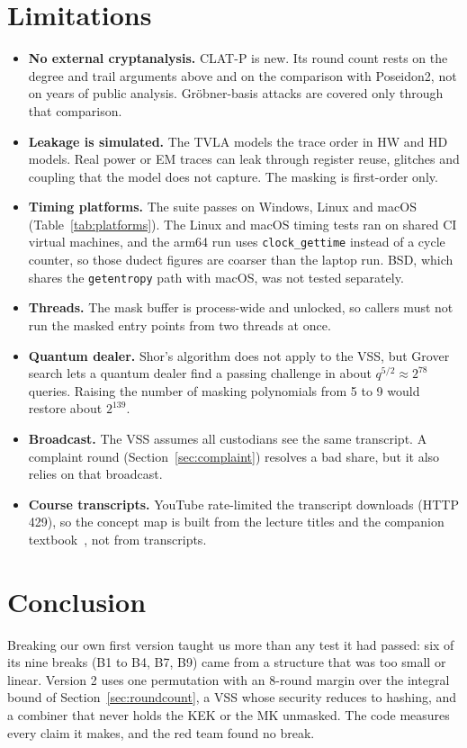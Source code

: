 \documentclass[10pt,a4paper]{article}
\newcommand{\code}[1]{\texttt{#1}}
\theoremstyle{definition}
\theoremstyle{remark}
\begin{document}
\section{Limitations}\label{sec:limits}
\begin{itemize}
  \item \textbf{No external cryptanalysis.} CLAT-P is new. Its round count rests on the degree and trail arguments above and on the comparison with Poseidon2, not on years of public analysis. Gr\"obner-basis attacks are covered only through that comparison.
  \item \textbf{Leakage is simulated.} The TVLA models the trace order in HW and HD models. Real power or EM traces can leak through register reuse, glitches and coupling that the model does not capture. The masking is first-order only.
  \item \textbf{Timing platforms.} The suite passes on Windows, Linux and macOS (Table~\ref{tab:platforms}). The Linux and macOS timing tests ran on shared CI virtual machines, and the arm64 run uses \code{clock\_gettime} instead of a cycle counter, so those dudect figures are coarser than the laptop run. BSD, which shares the \code{getentropy} path with macOS, was not tested separately.
  \item \textbf{Threads.} The mask buffer is process-wide and unlocked, so callers must not run the masked entry points from two threads at once.
  \item \textbf{Quantum dealer.} Shor's algorithm does not apply to the VSS, but Grover search lets a quantum dealer find a passing challenge in about $q^{5/2} \approx 2^{78}$ queries. Raising the number of masking polynomials from 5 to 9 would restore about $2^{139}$.
  \item \textbf{Broadcast.} The VSS assumes all custodians see the same transcript. A complaint round (Section~\ref{sec:complaint}) resolves a bad share, but it also relies on that broadcast.
  \item \textbf{Course transcripts.} YouTube rate-limited the transcript downloads (HTTP 429), so the concept map is built from the lecture titles and the companion textbook~\cite{paarbook}, not from transcripts.
\end{itemize}

\section{Conclusion}
Breaking our own first version taught us more than any test it had passed: six of its nine breaks (B1 to B4, B7, B9) came from a structure that was too small or linear. Version 2 uses one permutation with an 8-round margin over the integral bound of Section~\ref{sec:roundcount}, a VSS whose security reduces to hashing, and a combiner that never holds the KEK or the MK unmasked. The code measures every claim it makes, and the red team found no break.
\end{document}
